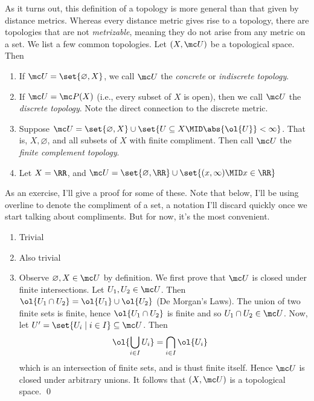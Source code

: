 \documentclass{fkbook}
\begin{document}
\begin{adjustwidth}{1em}{1em}
  As it turns out, this definition of a topology is more general than
  that given by distance metrics. Whereas every distance metric gives
  rise to a topology, there are topologies that are not
  \emph{metrizable}, meaning they do not arise from any metric on a
  set. We list a few common topologies. Let $(X, \mc U)$ be a
  topological space. Then
  \begin{enumerate}[label=\arabic*.]
    \item If $\mc U = \set{\varnothing, X}$, we call $\mc U$ the
      \emph{concrete} or \emph{indiscrete topology}.
    \item If $\mc U = \mc P(X)$ (i.e., every subset of $X$ is open),
      then we call $\mc U$ the \emph{discrete topology}. Note the
      direct connection to the discrete metric.
    \item Suppose $\mc U = \set{\varnothing, X} \cup \set{U \subseteq
        X \MID \abs{\ol{U}} < \infty}$. That is, $X, \varnothing$, and
      all subsets of $X$ with finite compliment. Then call $\mc U$ the
      \emph{finite complement topology}.
    \item Let $X = \RR$, and $\mc U = \set{\varnothing, \RR} \cup
      \set{(x, \infty) \MID x \in \RR}$
  \end{enumerate}
  As an exercise, I'll give a proof for some of these. Note that
  below, I'll be using overline to denote the compliment of a set, a
  notation I'll discard quickly once we start talking about
  compliments. But for now, it's the most convenient.
  \begin{enumerate}[label=\arabic*.]
    \item Trivial
    \item Also trivial
    \item Observe $\varnothing, X \in \mc U$ by definition. We first
      prove that $\mc U$ is closed under finite intersections. Let
      $U_1, U_2 \in \mc U$. Then $\ol{U_1 \cap U_2} = \ol{U_1} \cup
      \ol{U_2}$ (De Morgan's Laws). The union of two finite sets is
      finite, hence $\ol{U_1 \cap U_2}$ is finite and so $U_1 \cap U_2
      \in \mc U$. Now, let $U' = \set{U_i \mid i \in I} \subseteq \mc
      U$. Then
      \begin{align*}
        \ol{\bigcup_{i \in I} U_i}
        &= \bigcap_{i \in I} \ol{U_i}
      \end{align*}
      which is an intersection of finite sets, and is thust finite
      itself. Hence $\mc U$ is closed under arbitrary unions. It
      follows that $(X, \mc U)$ is a topological space. \qed

\end{enumerate}
\end{adjustwidth}
\end{document}
